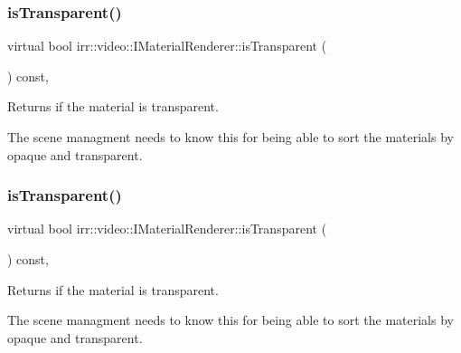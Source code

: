 \subsubsection{\texorpdfstring{is\+Transparent()}{isTransparent()}\hspace{0.1cm}{\footnotesize\ttfamily [1/2]}}
{\footnotesize\ttfamily virtual bool irr\+::video\+::\+I\+Material\+Renderer\+::is\+Transparent (\begin{DoxyParamCaption}{ }\end{DoxyParamCaption}) const\hspace{0.3cm}{\ttfamily [inline]}, {\ttfamily [virtual]}}



Returns if the material is transparent. 

The scene managment needs to know this for being able to sort the materials by opaque and transparent. \mbox{\label{classirr_1_1video_1_1IMaterialRenderer_ac472a5832eed8d848240c82278e56312}} 
\subsubsection{\texorpdfstring{is\+Transparent()}{isTransparent()}\hspace{0.1cm}{\footnotesize\ttfamily [2/2]}}
{\footnotesize\ttfamily virtual bool irr\+::video\+::\+I\+Material\+Renderer\+::is\+Transparent (\begin{DoxyParamCaption}{ }\end{DoxyParamCaption}) const\hspace{0.3cm}{\ttfamily [inline]}, {\ttfamily [virtual]}}



Returns if the material is transparent. 

The scene managment needs to know this for being able to sort the materials by opaque and transparent. \mbox{\label{classirr_1_1video_1_1IMaterialRenderer_a8cb6c5f93856de7586a318f14ed21a22}} 
